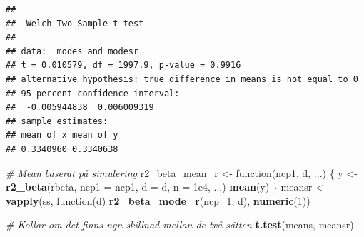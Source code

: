 \documentclass[]{article}
\newenvironment{Shaded}{\begin{snugshade}}{\end{snugshade}}
\newcommand{\KeywordTok}[1]{\textcolor[rgb]{0.13,0.29,0.53}{\textbf{{#1}}}}
\newcommand{\DataTypeTok}[1]{\textcolor[rgb]{0.13,0.29,0.53}{{#1}}}
\newcommand{\DecValTok}[1]{\textcolor[rgb]{0.00,0.00,0.81}{{#1}}}
\newcommand{\FloatTok}[1]{\textcolor[rgb]{0.00,0.00,0.81}{{#1}}}
\newcommand{\StringTok}[1]{\textcolor[rgb]{0.31,0.60,0.02}{{#1}}}
\newcommand{\CommentTok}[1]{\textcolor[rgb]{0.56,0.35,0.01}{\textit{{#1}}}}
\newcommand{\NormalTok}[1]{{#1}}
\begin{document}
\begin{Shaded}
\end{Shaded}

\begin{verbatim}
## 
##  Welch Two Sample t-test
## 
## data:  modes and modesr
## t = 0.010579, df = 1997.9, p-value = 0.9916
## alternative hypothesis: true difference in means is not equal to 0
## 95 percent confidence interval:
##  -0.005944838  0.006009319
## sample estimates:
## mean of x mean of y 
## 0.3340960 0.3340638
\end{verbatim}

\begin{Shaded}
\begin{Highlighting}[]
\CommentTok{# Mean baserat på simulering}
\NormalTok{r2_beta_mean_r <-}\StringTok{ }\NormalTok{function(ncp1, d, ...) \{}
  \NormalTok{y <-}\StringTok{ }\KeywordTok{r2_beta}\NormalTok{(rbeta, }\DataTypeTok{ncp1 =} \NormalTok{ncp1, }\DataTypeTok{d =} \NormalTok{d, }\DataTypeTok{n =} \FloatTok{1e4}\NormalTok{, ...)}
  \KeywordTok{mean}\NormalTok{(y)}
\NormalTok{\}}
\NormalTok{meansr <-}\StringTok{ }\KeywordTok{vapply}\NormalTok{(ss, function(d) }\KeywordTok{r2_beta_mode_r}\NormalTok{(ncp_1, d), }\KeywordTok{numeric}\NormalTok{(}\DecValTok{1}\NormalTok{))}

\CommentTok{# Kollar om det finns ngn skillnad mellan de två sätten }
\KeywordTok{t.test}\NormalTok{(means, meansr)}
\end{Highlighting}
\end{Shaded}
\end{document}
